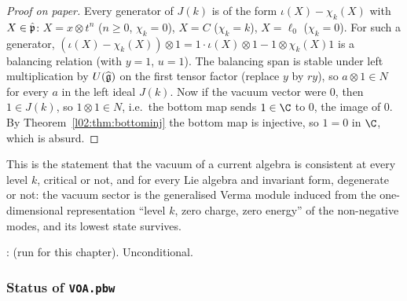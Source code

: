 \begin{proof}[Proof on paper]
Every generator of $J(k)$ is of the form $\iota(X) - \chi_k(X)$ with $X\in\hat{\mathfrak{p}}$: $X = x\otimes t^n$
($n\ge0$, $\chi_k = 0$), $X = C$ ($\chi_k = k$), $X = \ell_0$ ($\chi_k = 0$). For such a generator,
$(\iota(X) - \chi_k(X))\otimes1 = 1\cdot\iota(X)\otimes1 - 1\otimes\chi_k(X)1$ is a balancing relation (with
$y = 1$, $u = 1$). The balancing span is stable under left multiplication by $U(\widehat{\mathfrak{g}})$ on the first
tensor factor (replace $y$ by $ry$), so $a\otimes1\in N$ for every $a$ in the left ideal $J(k)$. Now if the
vacuum vector were $0$, then $1\in J(k)$, so $1\otimes1\in N$, i.e.\ the bottom map sends $1\in\C$ to $0$, the
image of $0$. By Theorem~\ref{l02:thm:bottominj} the bottom map is injective, so $1 = 0$ in $\C$, which is
absurd.
\end{proof}

\begin{physics}
This is the statement that the vacuum of a current algebra is consistent at every level $k$, critical
or not, and for every Lie algebra and invariant form, degenerate or not: the vacuum sector is the
generalised Verma module induced from the one-dimensional representation ``level $k$, zero charge, zero
energy'' of the non-negative modes, and its lowest state survives.
\end{physics}

\begin{status}
\allowbreak{}\allowbreak{}\allowbreak{}\allowbreak{}\allowbreak{}\allowbreak{}:  (run for
this chapter). Unconditional.
\end{status}

\subsubsection{Status of \texorpdfstring{\texttt{VOA.pbw}}{VOA.pbw}}

